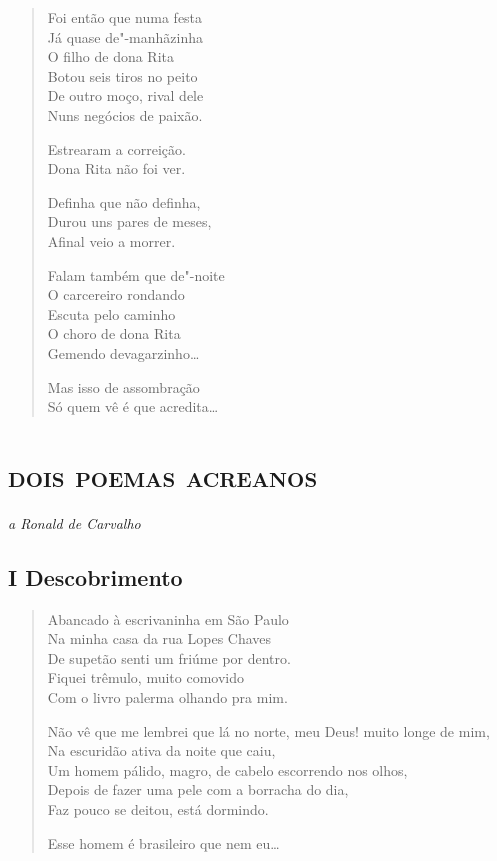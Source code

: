 \begin{verse}
Foi então que numa festa\\
Já quase de"-manhãzinha\\
O filho de dona Rita\\
Botou seis tiros no peito\\
De outro moço, rival dele\\
Nuns negócios de paixão.

Estrearam a correição.\\
Dona Rita não foi ver.

Definha que não definha,\\
Durou uns pares de meses,\\
Afinal veio a morrer.

Falam também que de"-noite\\
O carcereiro rondando\\
Escuta pelo caminho\\
O choro de dona Rita\\
Gemendo devagarzinho\ldots{}

Mas isso de assombração\\
Só quem vê é que acredita\ldots{}
\end{verse}

\chapter[\textsc{dois poemas acreanos}\\\textsc{i}\ \ Descobrimento]{\textsc{dois poemas acreanos}}

\begin{flushright}
\emph{a Ronald de Carvalho}
\end{flushright}

\section*{I \break Descobrimento}

\begin{verse}
Abancado à escrivaninha em São Paulo\\
Na minha casa da rua Lopes Chaves\\
De supetão senti um friúme por dentro.\\
Fiquei trêmulo, muito comovido\\
Com o livro palerma olhando pra mim.

Não vê que me lembrei que lá no norte, meu Deus! muito longe de mim,\\
Na escuridão ativa da noite que caiu,\\
Um homem pálido, magro, de cabelo escorrendo nos olhos,\\
Depois de fazer uma pele com a borracha do dia,\\
Faz pouco se deitou, está dormindo.

Esse homem é brasileiro que nem eu\ldots{}
\end{verse}

